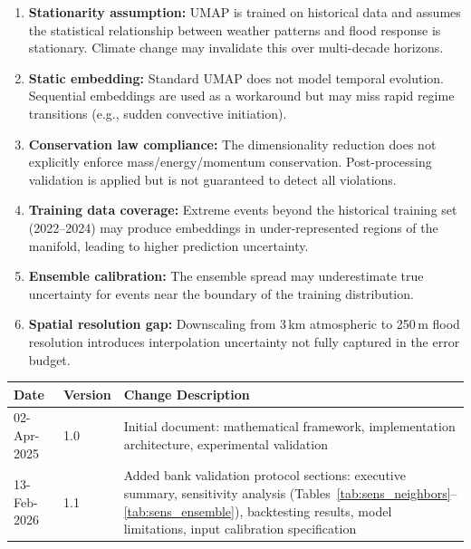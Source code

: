 \documentclass{article}
\begin{document}
\mkmlimitations

\begin{enumerate}
    \item \textbf{Stationarity assumption:} UMAP is trained on historical data and
          assumes the statistical relationship between weather patterns and flood response
          is stationary. Climate change may invalidate this over multi-decade horizons.

    \item \textbf{Static embedding:} Standard UMAP does not model temporal evolution.
          Sequential embeddings are used as a workaround but may miss rapid regime
          transitions (e.g., sudden convective initiation).

    \item \textbf{Conservation law compliance:} The dimensionality reduction does not
          explicitly enforce mass/energy/momentum conservation. Post-processing validation
          is applied but is not guaranteed to detect all violations.

    \item \textbf{Training data coverage:} Extreme events beyond the historical training
          set (2022--2024) may produce embeddings in under-represented regions of the
          manifold, leading to higher prediction uncertainty.

    \item \textbf{Ensemble calibration:} The ensemble spread may underestimate true
          uncertainty for events near the boundary of the training distribution.

    \item \textbf{Spatial resolution gap:} Downscaling from 3\,km atmospheric to 250\,m
          flood resolution introduces interpolation uncertainty not fully captured in the
          error budget.
\end{enumerate}

\mkmchangelog

\begin{longtable}{l|l|p{10cm}}
    \toprule
    \textbf{Date} & \textbf{Version} & \textbf{Change Description} \\
    \midrule
    \endhead
    02-Apr-2025 & 1.0 & Initial document: mathematical framework, implementation
    architecture, experimental validation \\
    \hline
    13-Feb-2026 & 1.1 & Added bank validation protocol sections: executive summary,
    sensitivity analysis (Tables~\ref{tab:sens_neighbors}--\ref{tab:sens_ensemble}),
    backtesting results, model limitations, input calibration specification \\
    \bottomrule
\end{longtable}
\end{document}
